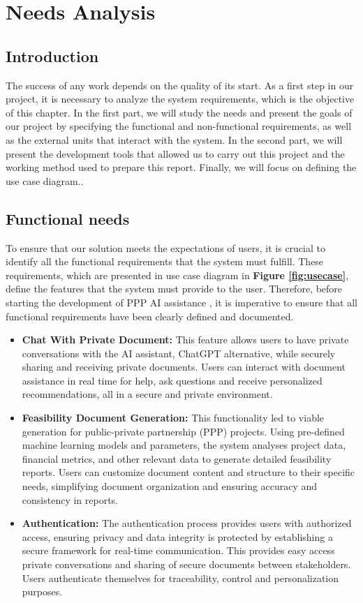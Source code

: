 \chapter{Needs Analysis}

\section{Introduction}
The success of any work depends on the quality of its start. As a first step in our project, it is necessary to analyze the system requirements, which is the objective of this chapter.
\vskip 0.5cm
In the first part, we will study the needs and present the goals of our project by specifying the functional and non-functional requirements, as well as the external units that interact with the system. In the second part, we will present the development tools that allowed us to carry out this project and the working method used to prepare this report. Finally, we will focus on defining the use case diagram..

\section{Functional needs}
To ensure that our solution meets the expectations of users, it is crucial to identify all the functional requirements that the system must fulfill. These requirements, which are presented in use case diagram in \textbf{Figure \ref{fig:usecase}}, define the features that the system must provide to the user. Therefore, before starting the development of PPP AI assistance , it is imperative to ensure that all functional requirements have been clearly defined and documented.
\begin{itemize}
    \item \textbf{Chat With Private Document:} This feature allows users to have private conversations with the AI assistant, ChatGPT alternative, while securely sharing and receiving private documents. Users can interact with document assistance in real time for help, ask questions and receive personalized recommendations, all in a secure and private environment.
    \item \textbf{Feasibility Document Generation:} This functionality led to viable generation for public-private partnership (PPP) projects. Using pre-defined machine learning models and parameters, the system analyses project data, financial metrics, and other relevant data to generate detailed feasibility reports. Users can customize document content and structure to their specific needs, simplifying document organization and ensuring accuracy and consistency in reports.
    \item \textbf{Authentication:} The authentication process provides users with authorized access, ensuring privacy and data integrity is protected by establishing a secure framework for real-time communication. This provides easy access private conversations and sharing of secure documents between stakeholders. Users authenticate themselves for traceability, control and personalization purposes.
\end{itemize}

